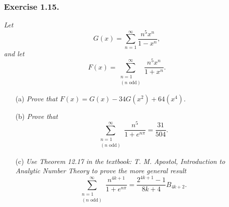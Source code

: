 \documentclass{article}
\begin{document}



\subsubsection*{Exercise 1.15.}
\emph{Let
\[
  G(x) = \sum_{n=1}^{\infty} \frac{n^5 x^n}{1-x^n},
\]
and let
\[
  F(x) = \sum_{\substack{n=1 \\ (\text{$n$ odd})}}^{\infty} \frac{n^5 x^n}{1+x^n}.
\]}
\begin{enumerate}
\item[(a)]
  \emph{Prove that $F(x) = G(x) - 34G(x^2) + 64(x^4)$.}

\item[(b)]
  \emph{Prove that
  \[
    \sum_{\substack{n=1 \\ (\text{$n$ odd})}}^{\infty} \frac{n^5}{1+e^{n\pi}}
    = \frac{31}{504}.
  \]}

\item[(c)]
  \emph{Use Theorem 12.17 in the textbook: T. M. Apostol, Introduction to Analytic Number Theory
  to prove the more general result}
  \[
    \sum_{\substack{n=1 \\ (\text{$n$ odd})}}^{\infty} \frac{n^{4k+1}}{1+e^{n\pi}}
    = \frac{2^{4k+1}-1}{8k+4}B_{4k+2}.
  \]
\end{enumerate}
\end{document}
